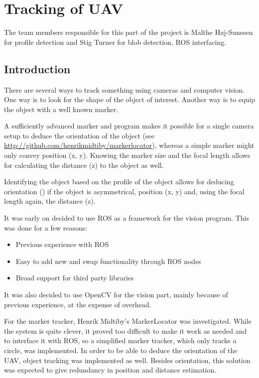 \section{Tracking of UAV}
\label{sec:tracking}
The team members responsible for this part of the project is Malthe Høj-Sunesen for profile detection and Stig Turner for blob detection, ROS interfacing.
\subsection{Introduction}
There are several ways to track something using cameras and computer vision. One way is to look for the shape of the object of interest. Another way is to equip the object with a well known marker. 

A sufficiently advanced marker and program makes it possible for a single camera setup to deduce the orientation of the object (see \url{http://github.com/henrikmidtiby/markerlocator}), whereas a simple marker might only convey position (x, y). Knowing the marker size and the focal length allows for calculating the distance (z) to the object as well.

Identifying the object based on the profile of the object allows for deducing orientation (\texttheta) if the object is asymmetrical, position (x, y) and, using the focal length again, the distance (z). 

It was early on decided to use ROS as a framework for the vision program. This was done for a few reasons:
\begin{itemize}
	\item Previous experience with ROS
	\item Easy to add new and swap functionality through ROS nodes
	\item Broad support for third party libraries
\end{itemize}

It was also decided to use OpenCV for the vision part, mainly because of previous experience, at the expense of overhead.

For the marker tracker, Henrik Midtiby’s MarkerLocator was investigated. While the system is quite clever, it proved too difficult to make it work as needed and to interface it with ROS, so a simplified marker tracker, which only tracks a circle, was implemented. In order to be able to deduce the orientation of the UAV, object tracking was implemented as well. Besides orientation, this solution was expected to give redundancy in position and distance estimation.
